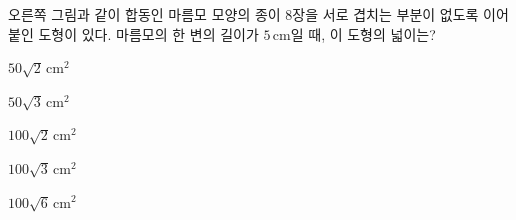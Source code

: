 \noindent\begin{minipage}[t]{0.58\linewidth}\vspace{0pt}\raggedright 오른쪽 그림과 같이 합동인 마름모 모양의 종이 $8$장을 서로 겹치는 부분이 없도록 이어 붙인 도형이 있다. 마름모의 한 변의 길이가 $5\,\mathrm{cm}$일 때, 이 도형의 넓이는?\end{minipage}\hfill\begin{minipage}[t]{0.4\linewidth}\vspace{0pt}\centering \resizebox{\ifdim\width>\linewidth\linewidth\else\width\fi}{!}{}\end{minipage}\par
\begin{choices32}{\rule[-3ex]{0pt}{8ex}$50\sqrt{2}\,\mathrm{cm}^2$}{\rule[-3ex]{0pt}{8ex}$50\sqrt{3}\,\mathrm{cm}^2$}{\rule[-3ex]{0pt}{8ex}$100\sqrt{2}\,\mathrm{cm}^2$}{\rule[-3ex]{0pt}{8ex}$100\sqrt{3}\,\mathrm{cm}^2$}{\rule[-3ex]{0pt}{8ex}$100\sqrt{6}\,\mathrm{cm}^2$}\end{choices32}
